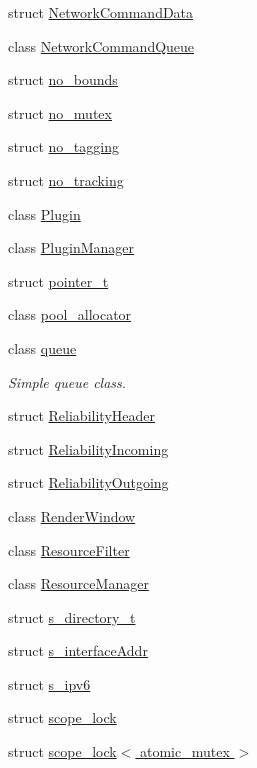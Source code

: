 \begin{DoxyCompactItemize}
struct \hyperlink{structcrap_1_1_network_command_data}{Network\+Command\+Data}
\item 
class \hyperlink{classcrap_1_1_network_command_queue}{Network\+Command\+Queue}
\item 
struct \hyperlink{structcrap_1_1no__bounds}{no\+\_\+bounds}
\item 
struct \hyperlink{structcrap_1_1no__mutex}{no\+\_\+mutex}
\item 
struct \hyperlink{structcrap_1_1no__tagging}{no\+\_\+tagging}
\item 
struct \hyperlink{structcrap_1_1no__tracking}{no\+\_\+tracking}
\item 
class \hyperlink{classcrap_1_1_plugin}{Plugin}
\item 
class \hyperlink{classcrap_1_1_plugin_manager}{Plugin\+Manager}
\item 
struct \hyperlink{structcrap_1_1pointer__t}{pointer\+\_\+t}
\item 
class \hyperlink{classcrap_1_1pool__allocator}{pool\+\_\+allocator}
\item 
class \hyperlink{classcrap_1_1queue}{queue}
\begin{DoxyCompactList}\small\item\em Simple queue class. \end{DoxyCompactList}\item 
struct \hyperlink{structcrap_1_1_reliability_header}{Reliability\+Header}
\item 
struct \hyperlink{structcrap_1_1_reliability_incoming}{Reliability\+Incoming}
\item 
struct \hyperlink{structcrap_1_1_reliability_outgoing}{Reliability\+Outgoing}
\item 
class \hyperlink{classcrap_1_1_render_window}{Render\+Window}
\item 
class \hyperlink{classcrap_1_1_resource_filter}{Resource\+Filter}
\item 
class \hyperlink{classcrap_1_1_resource_manager}{Resource\+Manager}
\item 
struct \hyperlink{structcrap_1_1s__directory__t}{s\+\_\+directory\+\_\+t}
\item 
struct \hyperlink{structcrap_1_1s__interface_addr}{s\+\_\+interface\+Addr}
\item 
struct \hyperlink{structcrap_1_1s__ipv6}{s\+\_\+ipv6}
\item 
struct \hyperlink{structcrap_1_1scope__lock}{scope\+\_\+lock}
\item 
struct \hyperlink{structcrap_1_1scope__lock_3_01atomic__mutex_01_4}{scope\+\_\+lock$<$ atomic\+\_\+mutex $>$}

\end{DoxyCompactItemize}

